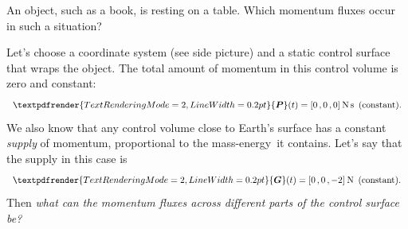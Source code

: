 \documentclass[a4paper,12pt,%
onecolumn,oneside,%
british%
]{memoir}
\renewcommand*{\bm}[1]{\textpdfrender{TextRenderingMode=2,LineWidth=0.2pt}{\boldsymbol{#1}}}
\renewcommand*{\|}[1][]{\nonscript\:#1\vert\nonscript\:\mathopen{}}
\newcommand*{\sect}{\S}%
\renewcommand*{\autoref}[2]{\sidepar{\vspace{-1ex}\footnotesize{\color{blue}\faIcon{%
angle-right%
}\enspace\sect~\ref{#1} page~\pageref{#1}}}\textcolor{blue}{#2}}
\newcommand*{\masse}{mass-energy}
\newcommand*{\yP}{\bm{P}}
\newcommand*{\yG}{\bm{G}}
\begin{document}
An object, such as a book, is resting on a table. Which momentum fluxes occur in such a situation?
%
%

Let's choose a coordinate system (see side picture) and a static control surface that wraps the object. The total amount of momentum in this control volume is zero and constant:
\begin{equation*}
  \yP(t) = [0\,,0\,,0]\:\unit{N\,s}\enspace\text{(constant)}.
\end{equation*}
We also know that any control volume close to Earth's surface %
has a constant \emph{supply} of momentum, proportional to the \masse\ it contains. Let's say that the supply in this case is
\begin{equation*}
  \yG(t) = [0\,,0\,,\num{-2}]\:\unit{N}\enspace\text{(constant)}.
\end{equation*}
Then \emph{what can the momentum fluxes across different parts of the control surface be?}
\end{document}
